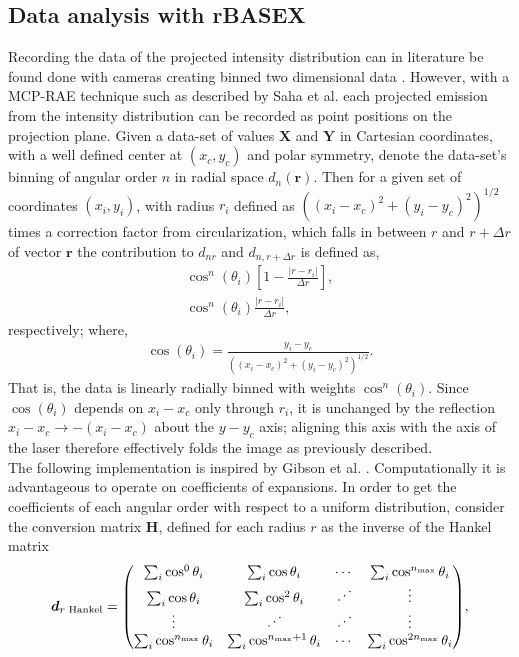 \documentclass[12pt]{article}
\begin{document}
\subsection{Data analysis with rBASEX}
Recording the data of the projected intensity distribution can in literature be found done with cameras creating binned two dimensional data \cite{gibson_stephen_pyabelpyabel_2022,marion_autodetachment_2020}. However, with a MCP-RAE technique such as described by Saha et al. \cite{saha_experimental_2017} each projected emission from the intensity distribution can be recorded as point positions on the projection plane. Given a data-set of values $\bm{X}$ and $\bm{Y}$ in Cartesian coordinates, with a well defined center at $(x_c,y_c)$ and polar symmetry, denote the data-set's binning of angular order $n$ in radial space $d_n(\bm{r})$. Then for a given set of coordinates $(x_i,y_i)$, with radius $r_i$ defined as $\left((x_i-x_c)^2+(y_i-y_c)^2\right)^{1/2}$ times a correction factor from circularization, which falls in between $r$ and $r+\Delta r$ of vector $\bm{r}$ the contribution to $d_{nr}$ and $d_{n,r+\Delta r}$ is defined as,
\begin{align*}
    \cos^n(\theta_i)\left[1-\frac{|r-r_i|}{\Delta r}\right],\\
    \cos^n(\theta_i)\frac{|r-r_i|}{\Delta r},
\end{align*}
respectively; where,
\begin{align*}
    \cos(\theta_i)=\frac{y_i-y_c}{\left((x_i-x_c)^2+(y_i-y_c)^2\right)^{1/2}}.
\end{align*}
That is, the data is linearly radially binned with weights $\cos^n(\theta_i)$. Since $\cos(\theta_i)$ depends on $x_i-x_c$ only through $r_i$, it is unchanged by the reflection $x_i-x_c\rightarrow-(x_i-x_c)$ about the $y-y_c$ axis; aligning this axis with the axis of the laser therefore effectively folds the image as previously described. \\
The following implementation is inspired by Gibson et al. \cite{gibson_stephen_pyabelpyabel_2022}. Computationally it is advantageous to operate on coefficients of expansions. In order to get the coefficients of each angular order with respect to a uniform distribution, consider the conversion matrix $\bm{H}$, defined for each radius $r$ as the inverse of the Hankel matrix
\begin{equation*}
    \bm{d}_{r\text{ Hankel}}=\mqty(\sum_i\cos^0\theta_i & \sum_i\cos\theta_i & \cdots & \sum_i\cos^{n_{\max}}\theta_i \\
    \sum_i\cos\theta_i & \sum_i\cos^2\theta_i & \iddots & \vdots \\
    \vdots & \iddots & \iddots & \vdots \\
    \sum_i\cos^{n_{\max}}\theta_i & \sum_i\cos^{n_{\max}+1}\theta_i & \cdots & \sum_i\cos^{2n_{\max}}\theta_i),
\end{equation*}
\end{document}
